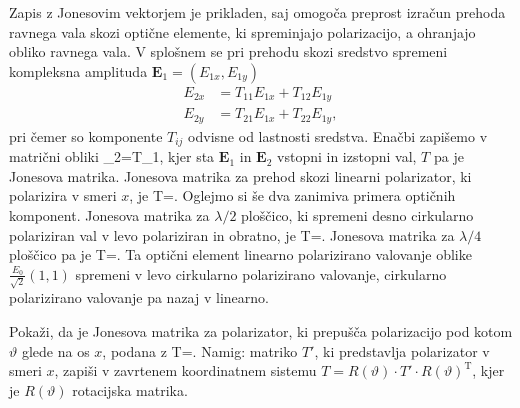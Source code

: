Zapis z Jonesovim vektorjem je prikladen, saj omogoča preprost izračun
prehoda ravnega vala skozi optične elemente, ki spreminjajo polarizacijo,
a ohranjajo obliko ravnega vala. V splošnem se pri prehodu skozi
sredstvo spremeni kompleksna amplituda $\mathbf{E}_1 = (E_{1x}, E_{1y})$
\begin{align}
E_{2x} & =T_{11}E_{1x}+T_{12}E_{1y}\\
E_{2y} & =T_{21}E_{1x}+T_{22}E_{1y},
\end{align}
pri čemer so komponente $T_{ij}$ odvisne od lastnosti sredstva. Enačbi zapišemo 
v matrični obliki
\beq
{}_{2}=T\cdot{}_{1},
\eeq
kjer sta $\mathbf{E}_{1}$ in $\mathbf{E}_{2}$
vstopni in izstopni val, $T$ pa je Jonesova
matrika. Jonesova matrika za prehod skozi linearni polarizator, ki
polarizira v smeri $x$, je
\beq
T=\left[\begin{array}{cc}
1 & 0\\
0 & 0
\end{array}\right].
\eeq
Oglejmo si še dva zanimiva primera optičnih komponent.
Jonesova matrika za $\lambda/2$ ploščico,
ki spremeni desno cirkularno polariziran val v levo polariziran in obratno,
je
\beq
T=\left[\begin{array}{cc}
1 & 0\\
0 & -1
\end{array}\right].
\eeq
Jonesova matrika za $\lambda/4$ ploščico pa je 
\beq
T=\left[\begin{array}{cc}
1 & 0\\
0 & i
\end{array}\right].
\eeq
Ta optični element linearno polarizirano valovanje oblike $\frac{E_{0}}{\sqrt{2}}(1,1)$
spremeni v levo cirkularno polarizirano valovanje, cirkularno polarizirano
valovanje pa nazaj v linearno. 

\begin{definition}
Pokaži, da je Jonesova matrika za polarizator,
ki prepušča polarizacijo pod kotom $\vartheta$ glede na os $x$, podana z
\beq
T=.
\eeq
Namig: matriko $T'$, ki predstavlja polarizator v smeri $x$, zapiši v zavrtenem
koordinatnem sistemu $T=R(\vartheta) \cdot {T'}\cdot R(\vartheta)^\textrm{T}$, 
kjer je $R(\vartheta)$ rotacijska matrika.
\end{definition}

